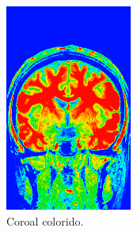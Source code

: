 \documentclass{article}
\begin{document}
\begin{figure}[H]
\begin{subfigure}[b]{0.3\textwidth}
        \includegraphics[width=\textwidth]{brain/neuroradiologist-coronal.png}
        \caption{Coroal colorido.}
    \end{subfigure}
    ~
    \begin{subfigure}[b]{0.3\textwidth}

\end{subfigure}
\end{figure}
\end{document}
